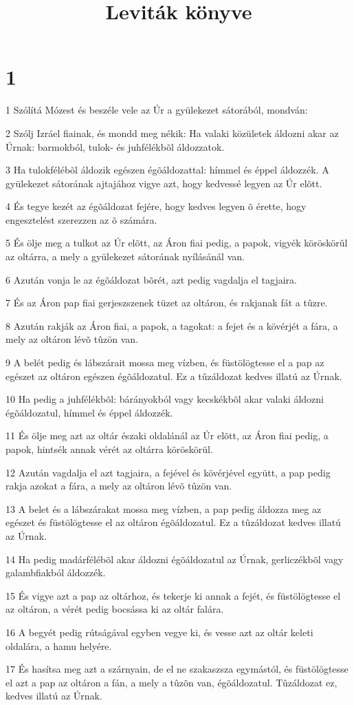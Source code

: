 

\title{Leviták könyve}


\chapter{1}

\par 1 Szólítá Mózest és beszéle vele az Úr a gyülekezet sátorából, mondván:
\par 2 Szólj Izráel fiainak, és mondd meg nékik: Ha valaki közületek áldozni akar az Úrnak: barmokból, tulok- és juhfélékbõl áldozzatok.
\par 3 Ha tulokfélébõl áldozik egészen égõáldozattal: hímmel és éppel áldozzék. A gyülekezet sátorának ajtajához vigye azt, hogy kedvessé legyen az Úr elõtt.
\par 4 És tegye kezét az égõáldozat fejére, hogy kedves legyen õ érette, hogy engesztelést szerezzen az õ számára.
\par 5 És ölje meg a tulkot az Úr elõtt, az Áron fiai pedig, a papok, vigyék köröskörûl az oltárra, a mely a gyülekezet sátorának nyílásánál van.
\par 6 Azután vonja le az égõáldozat bõrét, azt pedig vagdalja el tagjaira.
\par 7 És az Áron pap fiai gerjeszszenek tüzet az oltáron, és rakjanak fát a tûzre.
\par 8 Azután rakják az Áron fiai, a papok, a tagokat: a fejet és a kövérjét a fára, a mely az oltáron lévõ tûzön van.
\par 9 A belét pedig és lábszárait mossa meg vízben, és füstölögtesse el a pap az egészet az oltáron egészen égõáldozatul. Ez a tûzáldozat kedves illatú az Úrnak.
\par 10 Ha pedig a juhfélékbõl: bárányokból vagy kecskékbõl akar valaki áldozni égõáldozatul, hímmel és éppel áldozzék.
\par 11 És ölje meg azt az oltár északi oldalánál az Úr elõtt, az Áron fiai pedig, a papok, hintsék annak vérét az oltárra köröskörül.
\par 12 Azután vagdalja el azt tagjaira, a fejével és kövérjével együtt, a pap pedig rakja azokat a fára, a mely az oltáron lévõ tûzön van.
\par 13 A belet és a lábszárakat mossa meg vízben, a pap pedig áldozza meg az egészet és füstölögtesse el az oltáron égõáldozatul. Ez a tûzáldozat kedves illatú az Úrnak.
\par 14 Ha pedig madárfélébõl akar áldozni égõáldozatul az Úrnak, gerliczékbõl vagy galambfiakból áldozzék.
\par 15 És vigye azt a pap az oltárhoz, és tekerje ki annak a fejét, és füstölögtesse el az oltáron, a vérét pedig bocsássa ki az oltár falára.
\par 16 A begyét pedig rútságával egyben vegye ki, és vesse azt az oltár keleti oldalára, a hamu helyére.
\par 17 És hasítsa meg azt a szárnyain, de el ne szakaszsza egymástól, és füstölögtesse el azt a pap az oltáron a fán, a mely a tûzõn van, égõáldozatul. Tûzáldozat ez, kedves illatú az Úrnak.

